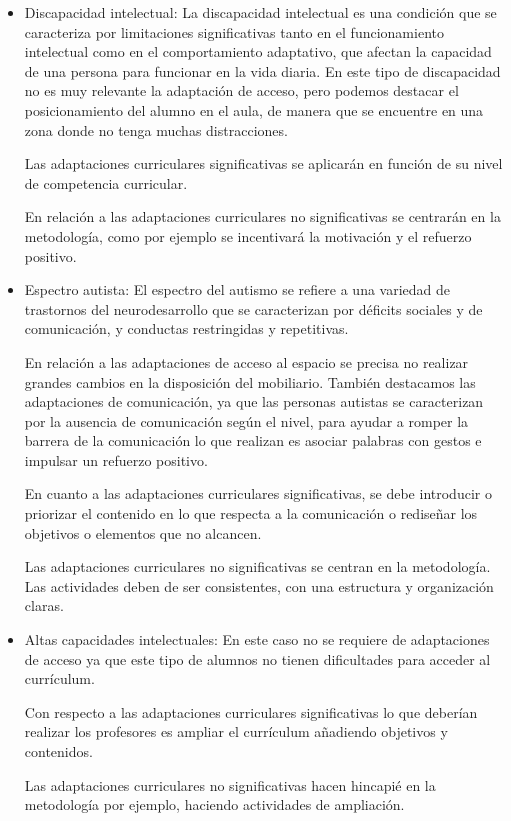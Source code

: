 \begin{itemize}
    \item Discapacidad intelectual: La discapacidad intelectual es una condición que se caracteriza por limitaciones significativas tanto en el funcionamiento intelectual como en el comportamiento adaptativo, que afectan la capacidad de una persona para funcionar en la vida diaria. En este tipo de discapacidad no es muy relevante la adaptación de acceso, pero podemos destacar el posicionamiento del alumno en el aula, de manera que se encuentre en una zona donde no tenga muchas distracciones.

          Las adaptaciones curriculares significativas se aplicarán en función de su nivel de competencia curricular.

          En relación a las adaptaciones curriculares no significativas se centrarán en la metodología, como por ejemplo se incentivará la motivación y el refuerzo positivo.

    \item Espectro autista: El espectro del autismo se refiere a una variedad de trastornos del neurodesarrollo que se caracterizan por déficits sociales y de comunicación, y conductas restringidas y repetitivas.

          En relación a las adaptaciones de acceso al espacio se precisa no realizar grandes cambios en la disposición del mobiliario. También destacamos las adaptaciones de comunicación, ya que las personas autistas se caracterizan por la ausencia de comunicación según el nivel, para ayudar a romper la barrera de la comunicación lo que realizan es asociar palabras con gestos e impulsar un refuerzo positivo.

          En cuanto a las adaptaciones curriculares significativas, se debe introducir o priorizar el contenido en lo que respecta a la  comunicación o rediseñar los objetivos o elementos que no alcancen.

          Las adaptaciones curriculares no significativas se centran en la metodología. Las actividades deben de ser consistentes, con una estructura y organización claras.

    \item Altas capacidades intelectuales: En este caso no se requiere de adaptaciones de acceso ya que  este tipo de alumnos no tienen dificultades para acceder al currículum.

          Con respecto a las adaptaciones curriculares significativas lo que deberían realizar los profesores es ampliar el currículum añadiendo objetivos y contenidos.

          Las adaptaciones curriculares no significativas hacen hincapié en la metodología por ejemplo, haciendo actividades de ampliación.

\end{itemize}
\nocite{adaptacionUNED}


